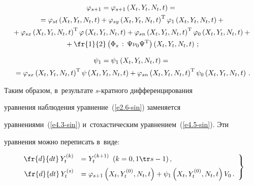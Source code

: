 \begin{multline*}


\varphi_{s+1}=\varphi_{s+1}\yxnt ={}\\


{}= \varphi_{st}\yxnt + \varphi_{sy}\yxnt^{\mathrm{T}} 


\varphi_{1}\yxnt+{}\\


{}+ \varphi_{sx}\yxnt^{\mathrm{T}} \varphi \yxnt +\varphi_{sn}\yxnt^{\mathrm{T}} \varphi_{0}\yxnt+{}\\


{}+ \fr{1}{2} \left(\Phi_s\,:\, \Psi\nu_0\Psi^{\mathrm{T}}\right) \yxnt\,;


\end{multline*}








\vspace*{-14pt}





\noindent


\begin{multline*}


\psi_1=\psi_1\yxnt ={}\\


{}= \varphi_{sx}\yxnt^{\mathrm{T}} \psi\yxnt +\varphi_{sn}\yxnt^{\mathrm{T}} 


\psi_0\yxnt\,.




\end{multline*}





Таким образом, в~результате $s$-крат\-но\-го дифференцирования


уравнения наблюдения  уравнение~(\ref{e2.6-sin}) заменяется


уравнениями~(\ref{e4.3-sin}) и~стохастическим уравнением~(\ref{e4.5-sin}). Эти


уравнения можно переписать в~виде:


\begin{equation}


\left.


\begin{array}{rl}


\displaystyle\fr{d}{dt}\, Y_t^{(k)}&= Y_t^{(k+1)}  \enskip (k=0,1\tr s-1)\,,


\\[6pt]


\displaystyle\fr{d}{dt}\, Y_t^{(s)}& =\varphi_{s+1}\left(X_t,Y_t^{(0)},N_t,t\right)  


+\psi_1 \left(X_t,Y_t^{(0)},N_t,t\right) V_0\,.




\end{array}


\right\}


\label{e4.7-sin}


\end{equation}





